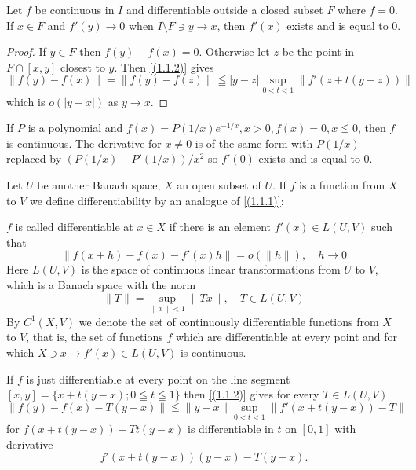 \begin{cor}
	Let $f$ be continuous in $I$ and differentiable outside a closed subset $F$ where $f=0$. If $x \in F$ and $f'(y) \rightarrow 0$ when $I \setminus F \ni y \rightarrow x$, then $f'(x)$ exists and is equal to $0$.
\end{cor}
\begin{proof}
	If $y \in F$ then $f(y)-f(x)=0$. Otherwise let $z$ be the point in $F \cap[x, y]$ closest to $y$. Then \eqref{(1.1.2)} gives
	\[
		\|f(y)-f(x)\|=\|f(y)-f(z)\| \leqq|y-z| \sup _{0<t<1}\left\|f'(z+t(y-z))\right\|
	\]
	which is $o(|y-x|)$ as $y \rightarrow x$.
\end{proof}

\begin{example}
	If $P$ is a polynomial and $f(x)=P(1 / x) e^{-1 / x}, x>0, f(x)=0, x \leqq 0$, then $f$ is continuous. The derivative for $x \neq 0$ is of the same form with $P(1 / x)$ replaced by $\left(P(1 / x)-P'(1 / x)\right) / x^{2}$ so $f'(0)$ exists and is equal to $0$.
\end{example}

Let $U$ be another Banach space, $X$ an open subset of $U$. If $f$ is a function from $X$ to $V$ we define differentiability by an analogue of \eqref{(1.1.1)}:

\begin{defi}
	$f$ is called differentiable at $x \in X$ if there is an element $f'(x) \in L(U, V)$ such that
	\begin{equation}
		\label{(1.1.1)''}
		\left\|f(x+h)-f(x)-f'(x) h\right\|=o(\|h\|), \quad h \rightarrow 0
	\end{equation}
	Here $L(U, V)$ is the space of continuous linear transformations from $U$ to $V$, which is a Banach space with the norm
	\[
		\|T\|=\sup _{\|x\|<1}\|T x\|, \quad T \in L(U, V)
	\]
	By $C^{1}(X, V)$ we denote the set of continuously differentiable functions from $X$ to $V$, that is, the set of functions $f$ which are differentiable at every point and for which $X \ni x \rightarrow f'(x) \in L(U, V)$ is continuous.
\end{defi}

If $f$ is just differentiable at every point on the line segment $[x, y]=\{x+t(y-x) ; 0 \leqq t \leqq 1\}$ then \eqref{(1.1.2)} gives for every $T \in L(U, V)$
\begin{equation}
	\label{(1.1.2)''}
	\|f(y)-f(x)-T(y-x)\| \leqq\|y-x\| \sup _{0<t<1}\left\|f'(x+t(y-x))-T\right\|
\end{equation}
for $f(x+t(y-x))-T t(y-x)$ is differentiable in $t$ on $[0,1]$ with derivative
\[
	f'(x+t(y-x))(y-x)-T(y-x) .
\]

